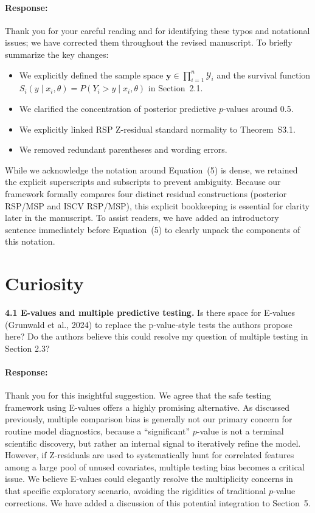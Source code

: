 \documentclass[11pt]{article}
\newcommand*{\mybox}[2]{%
  \par\medskip\noindent
  \colorbox{#1!30}{\parbox{.98\linewidth}{#2}}%
  \par\medskip
}
\begin{document}
\paragraph{Response:}
Thank you for your careful reading and for identifying these typos and notational issues; we have corrected them throughout the revised manuscript. To briefly summarize the key changes:
\begin{itemize}
    \item We explicitly defined the sample space $\mathbf{y} \in \prod_{i=1}^n\mathcal{Y}_i$ and the survival function $S_i(y\mid x_i,\theta)=P(Y_i>y\mid x_i,\theta)$ in Section~2.1.
    \item We clarified the concentration of posterior predictive $p$-values around 0.5.
    \item We explicitly linked RSP Z-residual standard normality to Theorem~S3.1.
    \item We removed redundant parentheses and wording errors. 
\end{itemize}

While we acknowledge the notation around Equation~(5) is dense, we retained the explicit superscripts and subscripts to prevent ambiguity. Because our framework formally compares four distinct residual constructions (posterior RSP/MSP and ISCV RSP/MSP), this explicit bookkeeping is essential for clarity later in the manuscript. To assist readers, we have added an introductory sentence immediately before Equation~(5) to clearly unpack the components of this notation.



\section*{Curiosity}

\mybox{gray}{\textbf{4.1 E-values and multiple predictive testing.} Is there space for E-values (Grunwald et al., 2024) to replace the p-value-style tests the authors propose here? Do the authors believe this could resolve my question of multiple testing in Section 2.3?}

\paragraph{Response:}
Thank you for this insightful suggestion. We agree that the safe testing framework using E-values \citep{Grunwald2024} offers a highly promising alternative. As discussed previously, multiple comparison bias is generally not our primary concern for routine model diagnostics, because a ``significant'' $p$-value is not a terminal scientific discovery, but rather an internal signal to iteratively refine the model. However, if Z-residuals are used to systematically hunt for correlated features among a large pool of unused covariates, multiple testing bias becomes a critical issue. We believe E-values could elegantly resolve the multiplicity concerns in that specific exploratory scenario, avoiding the rigidities of traditional $p$-value corrections. We have added a discussion of this potential integration to Section~5.
\end{document}
